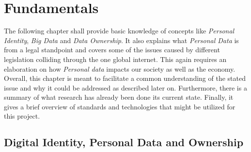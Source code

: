 \documentclass[12pt,english,a4paper,titlepage,cleardoublepage=empty,dottedtoc]{report}
\begin{document}
\hypertarget{fundamentals}{\chapter{Fundamentals}\label{fundamentals}}

The following chapter shall provide basic knowledge of concepts like
\emph{Personal Identity}, \emph{Big Data} and \emph{Data Ownership}. It
also explains what \emph{Personal Data} is from a legal standpoint and
covers some of the issues caused by different legislation colliding
through the one global internet. This again requires an elaboration on
how \emph{Personal data} impacts our society as well as the economy.
Overall, this chapter is meant to facilitate a common understanding of
the stated issue and why it could be addressed as described later on.
Furthermore, there is a summary of what research has already been done
its current state. Finally, it gives a brief overview of standards and
technologies that might be utilized for this project.

\hypertarget{digital-identity-personal-data-and-ownership}{\section{Digital
Identity, Personal Data and
Ownership}\label{digital-identity-personal-data-and-ownership}}
\end{document}
